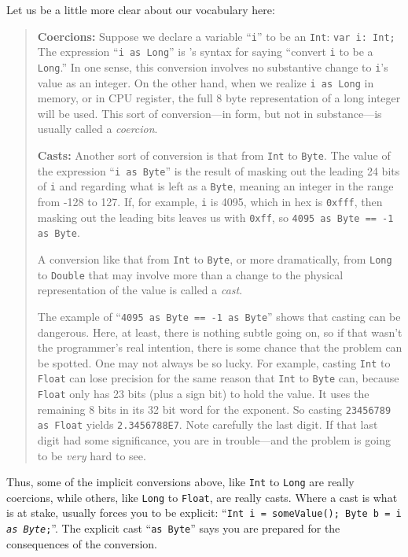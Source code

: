 Let us be a little more clear about our vocabulary here:
\begin{quote}
{\bf Coercions:} Suppose we declare a variable ``{\tt i}'' to be an {\tt Int}:
{\tt var i: Int;} The expression ``{\tt i as Long}'' is \Xten's syntax for
saying ``convert {\tt i} to be a {\tt Long}.''  In one sense, this conversion
involves no substantive change to {\tt i}'s value as an integer.  On the other
hand, when we realize {\tt i as Long} in memory, or in CPU register, the full 8
byte representation of a long integer will be used.  This sort of
conversion---in form, but not in substance---is usually called a {\em coercion}.

{\bf Casts:}  Another sort of conversion is that from {\tt Int} to {\tt Byte}. 
The value of the expression ``{\tt i as Byte}'' is the result of masking out the
leading 24 bits of {\tt i} and regarding what is left as a {\tt Byte}, meaning
an integer in the range from -128 to 127.  If, for example, {\tt i} is 4095,
which in hex is {\tt 0xfff}, then masking out the leading bits leaves us with
{\tt 0xff}, so {\tt 4095 as Byte == -1 as Byte}. 

A conversion like that from {\tt Int} to {\tt Byte}, or more dramatically, from
{\tt Long} to {\tt Double} that may involve more than a change to the physical
representation of the value is called a {\em cast}.

The example of ``{\tt 4095 as Byte == -1 as Byte}'' shows that casting can be
dangerous. Here, at least, there is nothing subtle going on, so if that wasn't
the programmer's real intention, there is some chance that the problem can be spotted.
One may not always be so lucky. For example, casting {\tt Int} to {\tt Float}
can lose precision for the same reason that {\tt Int} to {\tt Byte} can, because
{\tt Float} only has 23 bits (plus a sign bit) to hold the value.  It uses the
remaining 8 bits in its 32 bit word for the exponent.  So casting
{\tt 23456789 as Float} yields {\tt 2.3456788E7}.  Note carefully the
last digit.  If that last digit had some significance, you are in trouble---and
the problem is going to be {\em very} hard to see.
\end{quote}

Thus, some of the implicit conversions above, like {\tt Int} to {\tt Long} 
are really coercions, while others, like {\tt Long} to {\tt Float}, are
really casts. Where a cast is what is at stake, \Xten{} usually forces you to
be explicit: ``{\tt Int i = someValue(); Byte b = i {\em as Byte};}''.  The
explicit cast ``{\tt as Byte}'' says you are prepared for the consequences of
the conversion.

